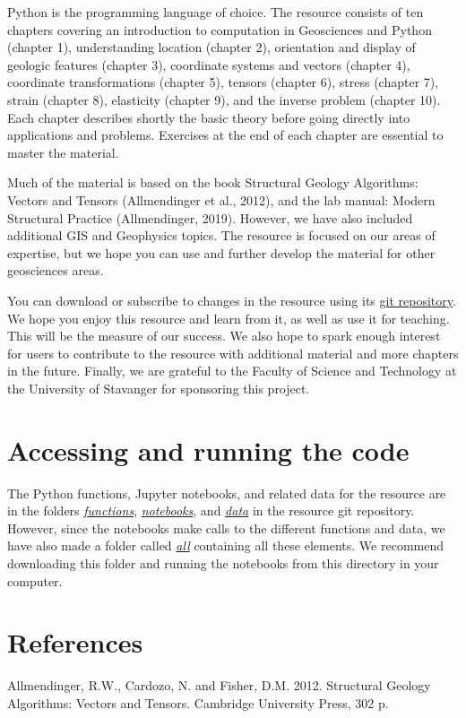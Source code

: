 \documentclass[a4paper , 12pt]{book}
\begin{document}
Python is the programming language of choice. The resource consists of ten chapters covering an introduction to computation in Geosciences and Python (chapter 1), understanding location (chapter 2), orientation and display of geologic features (chapter 3), coordinate systems and vectors (chapter 4), coordinate transformations (chapter 5), tensors (chapter 6), stress (chapter 7), strain (chapter 8), elasticity (chapter 9), and the inverse problem (chapter 10). Each chapter describes shortly the basic theory before going directly into applications and problems. Exercises at the end of each chapter are essential to master the material. 

Much of the material is based on the book Structural Geology Algorithms: Vectors and Tensors (Allmendinger et al., 2012), and the lab manual: Modern Structural Practice (Allmendinger, 2019). However, we have also included additional GIS and Geophysics topics. The resource is focused on our areas of expertise, but we hope you can use and further develop the material for other geosciences areas.

You can download or subscribe to changes in the resource using its \href{http://github.com}{git repository}. We hope you enjoy this resource and learn from it, as well as use it for teaching. This will be the measure of our success. We also hope to spark enough interest for users to contribute to the resource with additional material and more chapters in the future. Finally, we are grateful to the Faculty of Science and Technology at the University of Stavanger for sponsoring this project.

\section*{Accessing and running the code}

The Python functions, Jupyter notebooks, and related data for the resource are in the folders \href{http://github.com}{\textit{functions}}, \href{http://github.com}{\textit{notebooks}}, and \href{http://github.com}{\textit{data}} in the resource git repository. However, since the notebooks make calls to the different functions and data, we have also made a folder called \href{http://github.com}{\textit{all}} containing all these elements. We recommend downloading this folder and running the notebooks from this directory in your computer.

\section*{References}
Allmendinger, R.W., Cardozo, N. and Fisher, D.M. 2012. Structural Geology Algorithms: Vectors and Tensors. Cambridge University Press, 302 p.
\end{document}
